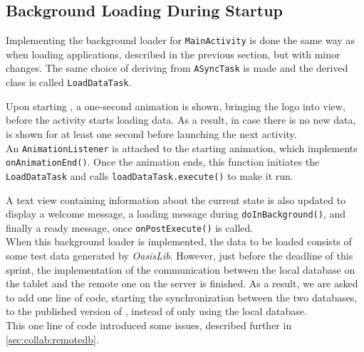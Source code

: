 \subsection{Background Loading During Startup}\label{sec:sprint4:dev:remotedbandbgloading}

Implementing the background loader for \lstinline|MainActivity| is done the same way as when loading applications, described in the previous section, but with minor changes.
The same choice of deriving from \lstinline!ASyncTask! is made and the derived class is called \lstinline!LoadDataTask!.

Upon starting \launcher, a one-second animation is shown, bringing the logo into view, before the activity starts loading data.
As a result, in case there is no new data, \mainactivty is shown for at least one second before launching the next activity.\\

An \lstinline!AnimationListener! is attached to the starting animation, which implements \lstinline|onAnimationEnd()|.
Once the animation ends, this function initiates the \lstinline!LoadDataTask! and calls \lstinline!loadDataTask.execute()! to make it run.

A text view containing information about the current state is also updated to display a welcome message, a loading message during \lstinline|doInBackground()|, and finally a ready message, once \lstinline|onPostExecute()| is called.\\

When this background loader is implemented, the data to be loaded consists of some test data generated by \textit{OasisLib}.
However, just before the deadline of this sprint, the implementation of the communication between the local database on the tablet and the remote one on the server is finished.
As a result, we are asked to add one line of code, starting the synchronization between the two databases, to the published version of \launcher, instead of only using the local database.\\

This one line of code introduced some issues, described further in \cref{sec:collab:remotedb}.